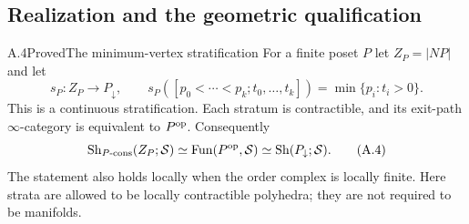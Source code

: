 \subsection{Realization and the geometric qualification}

\begin{statement}{A.4}{Proved}{The minimum-vertex stratification}
For a finite poset $P$ let $Z_P=|NP|$ and let
\[
 s_P:Z_P\longrightarrow P_{\downarrow},\qquad
 s_P([p_0<\cdots<p_k;t_0,\ldots,t_k])
       =\min\{p_i:t_i>0\}.
\]
This is a continuous stratification. Each stratum is contractible,
and its exit-path $\infty$-category is equivalent to $P^{\mathrm{op}}$.
Consequently
\[
 \operatorname{Sh}_{P\text{-cons}}(Z_P;\mathcal S)
 \simeq\operatorname{Fun}(P^{\mathrm{op}},\mathcal S)
 \simeq\operatorname{Sh}(P_{\downarrow};\mathcal S).
\tag{A.4}
\]
The statement also holds locally when the order complex is locally finite.
Here strata are allowed to be locally contractible polyhedra; they are
not required to be manifolds.
\end{statement}
